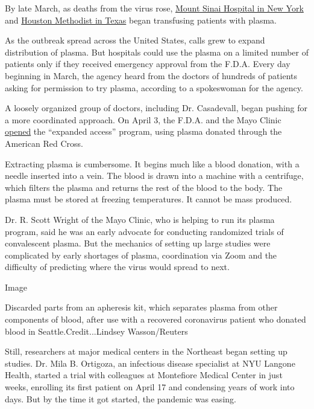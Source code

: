 By late March, as deaths from the virus rose,
\href{https://www.nytimes3xbfgragh.onion/2020/03/26/health/plasma-coronavirus-treatment.html}{Mount
Sinai Hospital in New York} and
\href{https://www.houstonmethodist.org/blog/articles/2020/mar/coronavirus-blood-transfusion-therapy-may-offer-promise-for-critically-ill-patients/}{Houston
Methodist in Texas} began transfusing patients with plasma.

As the outbreak spread across the United States, calls grew to expand
distribution of plasma. But hospitals could use the plasma on a limited
number of patients only if they received emergency approval from the
F.D.A. Every day beginning in March, the agency heard from the doctors
of hundreds of patients asking for permission to try plasma, according
to a spokeswoman for the agency.

A loosely organized group of doctors, including Dr. Casadevall, began
pushing for a more coordinated approach. On April 3, the F.D.A. and the
Mayo Clinic
\href{https://www.fda.gov/news-events/press-announcements/coronavirus-covid-19-update-fda-coordinates-national-effort-develop-blood-related-therapies-covid-19}{opened}
the ``expanded access'' program, using plasma donated through the
American Red Cross.

Extracting plasma is cumbersome. It begins much like a blood donation,
with a needle inserted into a vein. The blood is drawn into a machine
with a centrifuge, which filters the plasma and returns the rest of the
blood to the body. The plasma must be stored at freezing temperatures.
It cannot be mass produced.

Dr. R. Scott Wright of the Mayo Clinic, who is helping to run its plasma
program, said he was an early advocate for conducting randomized trials
of convalescent plasma. But the mechanics of setting up large studies
were complicated by early shortages of plasma, coordination via Zoom and
the difficulty of predicting where the virus would spread to next.

Image

Discarded parts from an apheresis kit, which separates plasma from other
components of blood, after use with a recovered coronavirus patient who
donated blood in Seattle.Credit...Lindsey Wasson/Reuters

Still, researchers at major medical centers in the Northeast began
setting up studies. Dr. Mila B. Ortigoza, an infectious disease
specialist at NYU Langone Health, started a trial with colleagues at
Montefiore Medical Center in just weeks, enrolling its first patient on
April 17 and condensing years of work into days. But by the time it got
started, the pandemic was easing.

